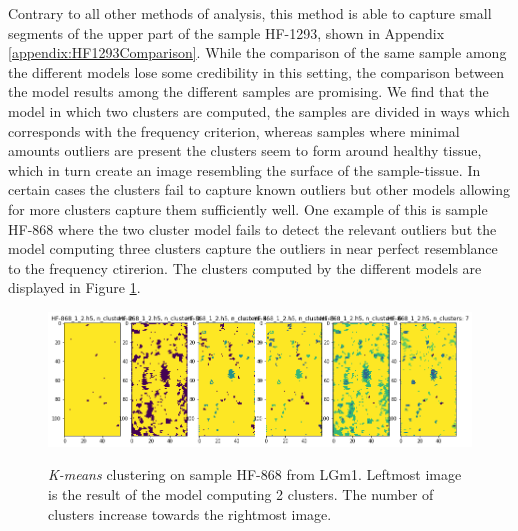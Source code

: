 Contrary to all other methods of analysis, this method is able to capture small segments of the upper part of the sample HF-1293, shown in Appendix \ref{appendix:HF1293Comparison}. While the comparison of the same sample among the different models lose some credibility in this setting, the comparison between the model results among the different samples are promising. We find that the model in which two clusters are computed, the samples are divided in ways which corresponds with the frequency criterion, whereas samples where minimal amounts outliers are present the clusters seem to form around healthy tissue, which in turn create an image resembling the surface of the sample-tissue. In certain cases the clusters fail to capture known outliers but other models allowing for more clusters capture them sufficiently well. One example of this is sample HF-868 where the two cluster model fails to detect the relevant outliers but the model computing three clusters capture the outliers in near perfect resemblance to the frequency ctirerion. The clusters computed by the different models are displayed in Figure \ref{fig:KM_HF868}.

\begin{figure}[H]

    \centering
{\includegraphics[width=15cm]{images/KMeans_full/LGm-1/HF-868_1_2.h5_0.png} }
\caption{\textit{K-means} clustering on sample HF-868 from LGm1. Leftmost image is the result of the model computing 2 clusters. The number of clusters increase towards the rightmost image.\label{fig:KM_HF868}}%

\end{figure}


